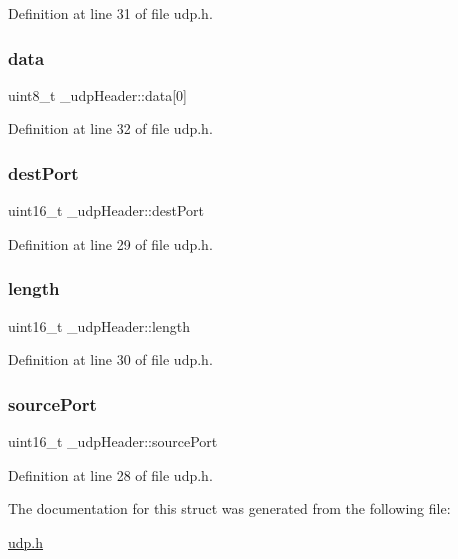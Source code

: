 Definition at line 31 of file udp.\+h.

\mbox{\label{struct__udpHeader_a1723bc19d441508c0cf4a9f506f37d68}} 
\subsubsection{\texorpdfstring{data}{data}}
{\footnotesize\ttfamily uint8\+\_\+t \+\_\+udp\+Header\+::data\mbox{[}0\mbox{]}}



Definition at line 32 of file udp.\+h.

\mbox{\label{struct__udpHeader_ad654bb71024cb9833c01f3a563ff5f65}} 
\subsubsection{\texorpdfstring{dest\+Port}{destPort}}
{\footnotesize\ttfamily uint16\+\_\+t \+\_\+udp\+Header\+::dest\+Port}



Definition at line 29 of file udp.\+h.

\mbox{\label{struct__udpHeader_a912e28858fbe7c6e92821bb7c0e8f93d}} 
\subsubsection{\texorpdfstring{length}{length}}
{\footnotesize\ttfamily uint16\+\_\+t \+\_\+udp\+Header\+::length}



Definition at line 30 of file udp.\+h.

\mbox{\label{struct__udpHeader_a318d6c6ebbb78b96e79451807b7187ec}} 
\subsubsection{\texorpdfstring{source\+Port}{sourcePort}}
{\footnotesize\ttfamily uint16\+\_\+t \+\_\+udp\+Header\+::source\+Port}



Definition at line 28 of file udp.\+h.



The documentation for this struct was generated from the following file\+:\begin{DoxyCompactItemize}
\item 
\hyperlink{udp_8h}{udp.\+h}\end{DoxyCompactItemize}
